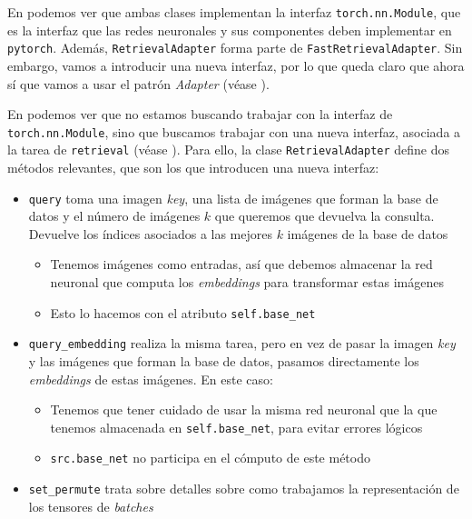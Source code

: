 En  podemos ver que ambas clases implementan la interfaz \lstinline{torch.nn.Module}, que es la interfaz que las redes neuronales y sus componentes deben implementar en \lstinline{pytorch}. Además, \lstinline{RetrievalAdapter} forma parte de \lstinline{FastRetrievalAdapter}. Sin embargo, vamos a introducir una nueva interfaz, por lo que queda claro que ahora sí que vamos a usar el patrón \textit{Adapter} (véase ).

En  podemos ver que no estamos buscando trabajar con la interfaz de \lstinline{torch.nn.Module}, sino que buscamos trabajar con una nueva interfaz, asociada a la tarea de \lstinline{retrieval} (véase ). Para ello, la clase \lstinline{RetrievalAdapter} define dos métodos relevantes, que son los que introducen una nueva interfaz:

\begin{itemize}
    \item \lstinline{query} toma una imagen \textit{key}, una lista de imágenes que forman la base de datos y el número de imágenes $k$ que queremos que devuelva la consulta. Devuelve los índices asociados a las mejores $k$ imágenes de la base de datos
        \begin{itemize}
            \item Tenemos imágenes como entradas, así que debemos almacenar la red neuronal que computa los \textit{embeddings} para transformar estas imágenes
            \item Esto lo hacemos con el atributo \lstinline{self.base_net}
        \end{itemize}
    \item \lstinline{query_embedding} realiza la misma tarea, pero en vez de pasar la imagen \textit{key} y las imágenes que forman la base de datos, pasamos directamente los \textit{embeddings} de estas imágenes. En este caso:
        \begin{itemize}
            \item Tenemos que tener cuidado de usar la misma red neuronal que la que tenemos almacenada en \lstinline{self.base_net}, para evitar errores lógicos
            \item \lstinline{src.base_net} no participa en el cómputo de este método
        \end{itemize}
    \item \lstinline{set_permute} trata sobre detalles sobre como trabajamos la representación de los tensores de \textit{batches}
\end{itemize}


